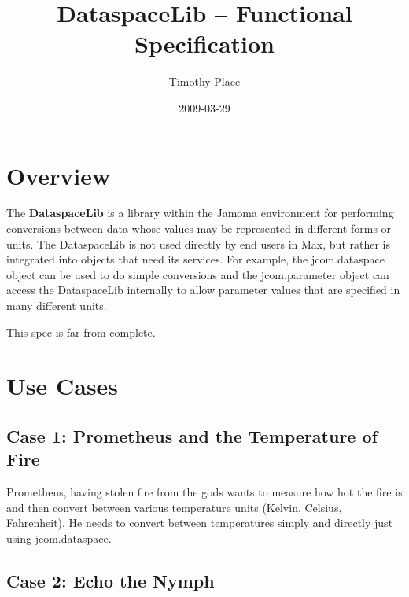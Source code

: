 \documentclass[]{article}
\title{DataspaceLib -- Functional Specification}
\author{ Timothy Place }
\date{2009-03-29}
\begin{document}
\ifpdf
{}
\else
{}
\fi

\maketitle


\begin{abstract}
\end{abstract}





\section{Overview}

The \textbf{DataspaceLib} is a library within the Jamoma environment for performing conversions between data whose values may be represented in different forms or units.  The DataspaceLib is not used directly by end users in Max, but rather is integrated into objects that need its services.  For example, the jcom.dataspace object can be used to do simple conversions and the jcom.parameter object can access the DataspaceLib internally to allow parameter values that are specified in many different units.

This spec is far from complete.



\section{Use Cases}

\subsection{Case 1: Prometheus and the Temperature of Fire}

Prometheus, having stolen fire from the gods wants to measure how hot the fire is and then convert between various temperature units (Kelvin, Celsius, Fahrenheit).  He needs to convert between temperatures simply and directly just using jcom.dataspace.


\subsection{Case 2: Echo the Nymph}
\end{document}
